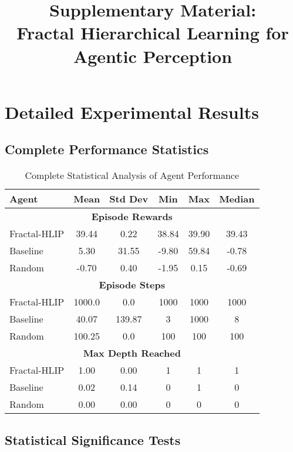 \documentclass[11pt]{article}
\title{Supplementary Material: \\
Fractal Hierarchical Learning for Agentic Perception}
\begin{document}
\maketitle

\section{Detailed Experimental Results}

\subsection{Complete Performance Statistics}

\begin{table}[h]
\centering
\caption{Complete Statistical Analysis of Agent Performance}
\begin{tabular}{lccccc}
\toprule
Agent & Mean & Std Dev & Min & Max & Median \\
\midrule
\multicolumn{6}{c}{\textbf{Episode Rewards}} \\
Fractal-HLIP & 39.44 & 0.22 & 38.84 & 39.90 & 39.43 \\
Baseline & 5.30 & 31.55 & -9.80 & 59.84 & -0.78 \\
Random & -0.70 & 0.40 & -1.95 & 0.15 & -0.69 \\
\midrule
\multicolumn{6}{c}{\textbf{Episode Steps}} \\
Fractal-HLIP & 1000.0 & 0.0 & 1000 & 1000 & 1000 \\
Baseline & 40.07 & 139.87 & 3 & 1000 & 8 \\
Random & 100.25 & 0.0 & 100 & 100 & 100 \\
\midrule
\multicolumn{6}{c}{\textbf{Max Depth Reached}} \\
Fractal-HLIP & 1.00 & 0.00 & 1 & 1 & 1 \\
Baseline & 0.02 & 0.14 & 0 & 1 & 0 \\
Random & 0.00 & 0.00 & 0 & 0 & 0 \\
\bottomrule
\end{tabular}
\end{table}

\subsection{Statistical Significance Tests}
\end{document}
